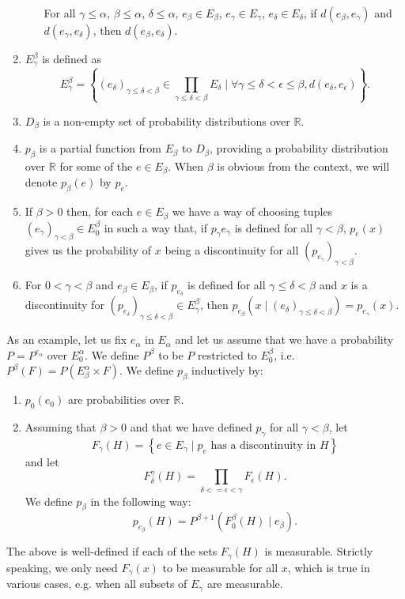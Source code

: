 \documentclass[a4paper
,draft
]{article}
\def\reale{\mathbb{R}}
\newcommand{\multime}[1]{\left\{ #1 \right\}}
\begin{document}
\begin{enumerate}
\begin{enumerate}
                For all $\gamma\le\alpha$, $\beta\le\alpha$, $\delta\le\alpha$,
                $e_\beta\in E_\beta$, $e_\gamma\in E_\gamma$,
                $e_\delta\in E_\delta$, if $d(e_\beta, e_\gamma)$ and
                $d(e_\gamma, e_\delta)$, then $d(e_\beta, e_\delta)$.
        \end{enumerate}
  \item $E^\beta_\gamma$ is defined as
        $$E^\beta_\gamma=\multime{
          (e_\delta)_{\gamma\le \delta < \beta}
            \in\prod_{\gamma\le \delta < \beta}E_\delta
          \mid
          \forall \gamma\le\delta<\epsilon\le\beta, d(e_\delta, e_\epsilon)}.$$
  \item $D_\beta$ is a non-empty set of probability distributions over $\reale$.
  \item $p_\beta$ is a partial function from $E_\beta$ to $D_\beta$, providing
        a probability distribution over $\reale$ for some of the $e\in E_\beta$.
        When $\beta$ is obvious from the context, we will denote $p_\beta(e)$
        by $p_e$.
  \item If $\beta > 0$ then, for each $e\in E_\beta$ we have a way of choosing
        tuples $(e_\gamma)_{\gamma<\beta}\in E^\beta_0$ in such a way that,
        if $p_\gamma{e_\gamma}$ is defined for all $\gamma<\beta$,
        $p_e(x)$ gives us the probability of $x$ being a discontinuity for
        all $(p_{e_\gamma})_{\gamma<\beta}$.
  \item For $0 < \gamma < \beta$ and $e_\beta\in E_\beta$, if
        $p_{e_\delta}$ is defined for all $\gamma\le\delta<\beta$ and $x$ is a
        discontinuity for
        $(p_{e_\delta})_{\gamma\le\delta<\beta}\in E^\beta_\gamma$, then
        $p_{e_\beta}(x \mid (e_\delta)_{\gamma\le\delta<\beta})
          = p_{e_\gamma}(x)$.
\end{enumerate}

As an example, let us fix $e_\alpha$ in $E_\alpha$ and let us assume that we
have a probability $P = P^{e_\alpha}$ over $E^\alpha_0$. We
define $P^\beta$ to be $P$ restricted to
$E^\beta_0$, i.e. $P^\beta(F) = P(E^\alpha_\beta \times F)$.
We define $p_\beta$ inductively by:
\begin{enumerate}
  \item $p_0(e_0)$ are probabilities over $\reale$.
  \item Assuming that $\beta > 0$ and that we have defined $p_\gamma$
        for all $\gamma < \beta$, let
        $$F_\gamma(H) =
          \multime{e\in E_\gamma
            \mid p_e \mbox { has a discontinuity in }H}$$
        and let
        $$F^\gamma_\delta(H)
          = \prod_{\delta <= \epsilon < \gamma}F_\epsilon(H).$$
        We define $p_{\beta}$ in the following way:
        $$p_{e_{\beta}}(H) =
          P^{\beta + 1}(F^{\beta}_0(H) \mid e_{\beta}).$$
\end{enumerate}
The above is well-defined if each of the sets $F_\gamma(H)$ is
measurable. Strictly speaking, we only need $F_\gamma(x)$ to be measurable for
all $x$, which is true in various cases, e.g. when all subsets of $E_\gamma$ are
measurable.
\end{document}

